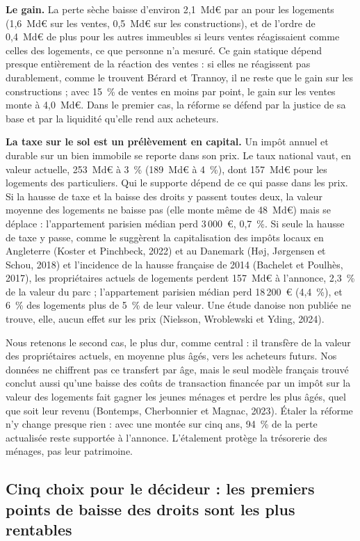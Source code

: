 \documentclass[11pt,a4paper]{article}
\begin{document}
\textbf{Le gain.} La perte sèche baisse d'environ 2,1~Md€ par an pour les logements (1,6~Md€ sur les ventes, 0,5~Md€ sur
les constructions), et de l'ordre de 0,4~Md€ de plus pour les autres immeubles si leurs ventes réagissaient comme celles
des logements, ce que personne n'a mesuré. Ce gain statique dépend presque entièrement de la réaction des ventes : si
elles ne réagissent pas durablement, comme le trouvent Bérard et Trannoy, il ne reste que le gain sur les constructions ;
avec 15~\% de ventes en moins par point, le gain sur les ventes monte à 4,0~Md€. Dans le premier cas, la réforme se
défend par la justice de sa base et par la liquidité qu'elle rend aux acheteurs.

\textbf{La taxe sur le sol est un prélèvement en capital.} Un impôt annuel et durable sur un bien immobile se reporte dans
son prix. Le taux national vaut, en valeur actuelle, 253~Md€ à 3~\% (189~Md€ à 4~\%), dont 157~Md€ pour les logements des
particuliers. Qui le supporte dépend de ce qui passe dans les prix. Si la hausse de taxe et la baisse des droits y passent toutes deux, la valeur
moyenne des logements ne baisse pas (elle monte même de 48~Md€) mais se déplace : l'appartement parisien médian perd
3\,000~€, 0,7~\%. Si seule la hausse de taxe y passe, comme le suggèrent la capitalisation des impôts locaux en Angleterre
(Koster et Pinchbeck, 2022) et au Danemark (Høj, Jørgensen et Schou, 2018) et l'incidence de la hausse française de 2014
(Bachelet et Poulhès, 2017), les propriétaires actuels de logements perdent 157~Md€ à l'annonce, 2,3~\% de la valeur du
parc ; l'appartement parisien médian perd 18\,200~€ (4,4~\%), et 6~\% des logements plus de 5~\% de leur valeur. Une étude
danoise non publiée ne trouve, elle, aucun effet sur les prix (Nielsson, Wroblewski et Yding, 2024).

Nous retenons le second cas, le plus dur, comme central : il transfère de la valeur des propriétaires actuels, en
moyenne plus âgés, vers les acheteurs futurs. Nos données ne chiffrent pas ce transfert par âge, mais le seul modèle
français trouvé conclut aussi qu'une baisse des coûts de transaction financée par un impôt sur la valeur des logements
fait gagner les jeunes ménages et perdre les plus âgés, quel que soit leur revenu (Bontemps, Cherbonnier et Magnac,
2023). Étaler la réforme n'y change presque rien : avec une montée sur cinq ans, 94~\% de
la perte actualisée reste supportée à l'annonce. L'étalement protège la trésorerie des ménages, pas leur patrimoine.

\subsection{Cinq choix pour le décideur : les premiers points de baisse des droits sont les plus rentables}
\end{document}

